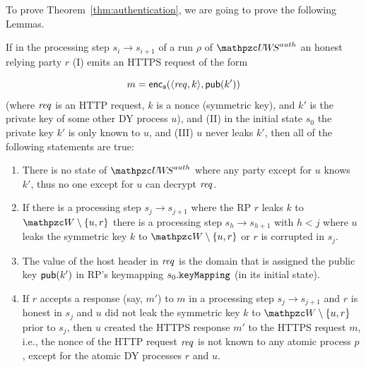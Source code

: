   To prove Theorem~\ref{thm:authentication}, we are going to prove the following Lemmas.
  
  \begin{lemma}\label{lemma:k-does-not-leak-from-honest-rp} 
    If in the processing step $s_i \rightarrow s_{i+1}$ of a run $\rho$
    of $\uppressoauthwebsystem$ an honest relying party $r$ (I) emits an HTTPS
    request of the form
  
    \[ m = \mathsf{enc}_\mathsf{a}(\langle\mathit{req}, k\rangle,\mathsf{pub}(k')) \]
    (where $\mathit{req}$ is an HTTP request, $k$ is a nonce (symmetric
    key), and $k'$ is the private key of some other DY process $u$), and (II) in the
    initial state $s_0$ the private key $k'$ is only known to $u$, and
    (III) $u$ never leaks $k'$, then all of the following
    statements are true:
    \begin{enumerate}
    \item There is no state of $\uppressoauthwebsystem$ where any party except
      for $u$ knows $k'$, thus no one except for $u$ can
      decrypt $\mathit{req}$.
      \label{prop:attacker-cannot-decrypt-spresso}
    \item If there is a processing step $s_j \rightarrow s_{j+1}$ where
      the RP $r$ leaks $k$ to $\bidsystem \setminus \{u, r\}$ there
      is a processing step $s_h \rightarrow s_{h+1}$ with $h < j$
      where $u$ leaks the symmetric key $k$ to $\bidsystem \setminus
      \{u,r\}$ or $r$ is corrupted in
      $s_j$. \label{prop:k-doesnt-leak-spresso}
    \item The value of the host header in $\mathit{req}$ is the domain that
      is assigned the public key $\mathsf{pub}(k')$ in RP's keymapping
      $s_0.\mathtt{keyMapping}$ (in its initial
      state). \label{prop:host-header-matches-spresso}
    \item If $r$ accepts a response (say, $m'$) to $m$ in a processing step $s_j
      \rightarrow s_{j+1}$ and $r$ is honest in $s_j$ and $u$ did not
      leak the symmetric key $k$ to $\bidsystem \setminus \{u,r\}$ prior
      to $s_j$, then $u$ created the HTTPS response $m'$ to the HTTPS
      request $m$, i.e., the nonce of the HTTP request $\mathit{req}$ is not known to
      any atomic process $p$, except for the atomic DY processes $r$ and
      $u$.\label{prop:only-owner-answers-spresso}
    \end{enumerate}
  \end{lemma}
  
  
